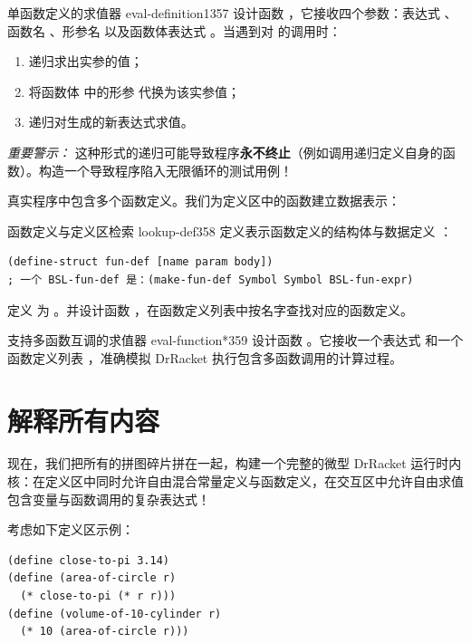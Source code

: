 \begin{exercise}{单函数定义的求值器 eval-definition1}{357}
设计函数 ，它接收四个参数：表达式 、函数名 、形参名  以及函数体表达式 。当遇到对  的调用时：
\begin{enumerate}
  \item 递归求出实参的值；
  \item 将函数体  中的形参  代换为该实参值；
  \item 递归对生成的新表达式求值。
\end{enumerate}
\emph{重要警示：} 这种形式的递归可能导致程序\textbf{永不终止}（例如调用递归定义自身的函数）。构造一个导致程序陷入无限循环的测试用例！
\end{exercise}

真实程序中包含多个函数定义。我们为定义区中的函数建立数据表示：

\begin{exercise}{函数定义与定义区检索 lookup-def}{358}
定义表示函数定义的结构体与数据定义 ：
\begin{lstlisting}[language=BSL]
(define-struct fun-def [name param body])
; 一个 BSL-fun-def 是：(make-fun-def Symbol Symbol BSL-fun-expr)
\end{lstlisting}
定义  为 。并设计函数 ，在函数定义列表中按名字查找对应的函数定义。
\end{exercise}

\begin{exercise}{支持多函数互调的求值器 eval-function*}{359}
设计函数 。它接收一个表达式  和一个函数定义列表 ，准确模拟 DrRacket 执行包含多函数调用的计算过程。
\end{exercise}

\section{解释所有内容 }
\label{sec:21.4_eval_everything}

现在，我们把所有的拼图碎片拼在一起，构建一个完整的微型 DrRacket 运行时内核：在定义区中同时允许自由混合常量定义与函数定义，在交互区中允许自由求值包含变量与函数调用的复杂表达式！

考虑如下定义区示例：
\begin{lstlisting}[language=BSL]
(define close-to-pi 3.14)
(define (area-of-circle r)
  (* close-to-pi (* r r)))
(define (volume-of-10-cylinder r)
  (* 10 (area-of-circle r)))
\end{lstlisting}

